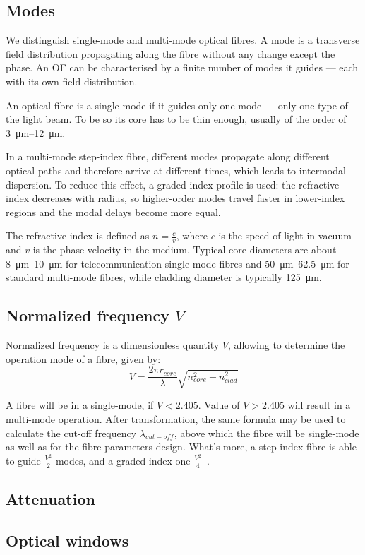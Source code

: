 \subsection{Modes}
We distinguish single-mode and multi-mode optical fibres.
A mode is a transverse field distribution propagating along the fibre without any change except the phase.
An OF can be characterised by a finite number of modes it guides --- each with its own field distribution. 

An optical fibre is a single-mode if it guides only one mode --- only one type of the light beam.
To be so its core has to be thin enough, usually of the order of \qtyrange{3}{12}{\um}.

In a multi-mode step-index fibre, different modes propagate along different optical paths and therefore arrive at different times, which leads to intermodal dispersion. To reduce this effect, a graded-index profile is used: the refractive index decreases with radius, so higher-order modes travel faster in lower-index regions and the modal delays become more equal.

The refractive index is defined as $n=\frac{c}{v}$, where $c$ is the speed of light in vacuum and $v$ is the phase velocity in the medium. Typical core diameters are about \qtyrange{8}{10}{\um} for telecommunication single-mode fibres and \qtyrange{50}{62.5}{\um} for standard multi-mode fibres, while cladding diameter is typically \qty{125}{\um}.

\subsection{Normalized frequency $V$}\label{normalized_frequency}
Normalized frequency is a dimensionless quantity $V$, allowing to determine the operation mode of a fibre, given by:
\begin{equation}\label{eqn:v}
    V = \frac{2\pi r_{core }}{\lambda}\sqrt{n_{core}^2-n_{clad}^2}
\end{equation}

A fibre will be in a single-mode, if $V<2.405$. Value of $V>2.405$ will result in a multi-mode operation. After transformation, the same formula may be used to calculate the cut-off frequency $\lambda_{cut-off}$, above which the fibre will be single-mode as well as for the fibre parameters design. What's more, a step-index fibre is able to guide $\frac{V^2}{2}$ modes, and a graded-index one $\frac{V^2}{4}$~\cite{agrawal6}. 

\subsection{Attenuation}\label{sec:attenuation}
\subsection{Optical windows}
